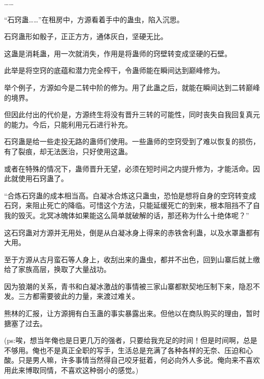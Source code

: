 \begin{this_body}
……

“石窍蛊……”在租房中，方源看着手中的蛊虫，陷入沉思。

石窍蛊形如骰子，正正方方，通体灰白，坚硬无比。

这蛊是消耗蛊，用一次就消失，作用是将蛊师的窍壁转变成坚硬的石壁。

此举是将空窍的底蕴和潜力完全榨干，令蛊师能在瞬间达到巅峰修为。

举个例子，方源如今是二转中阶的修为。用了此蛊之后，就能在瞬间达到二转巅峰的境界。

但因此付出的代价是，方源终生将没有晋升三转的可能性，同时丧失自我回复真元的能力。今后，只能利用元石进行补充。

石窍蛊是给一些走投无路的蛊师们使用。一些蛊师的空窍受到了难以恢复的损伤，有了裂痕，却无法医治，只好使用这蛊。

或者在特殊的情况下，蛊师晋升无望，必须在短时间之内提升修为，才能活命。因此就使用石窍蛊了。

“合炼石窍蛊的成本相当高。白凝冰合炼这只蛊虫，恐怕是想将自身的空窍转变成石窍，来阻止死亡的降临。可惜这个方法，只能延缓死亡的到来，根本阻挡不了自我的毁灭。北冥冰魄体如果能这么简单就破解的话，那还称为什么十绝体呢？”

这石窍蛊对方源并无用处，倒是从白凝冰身上得来的赤铁舍利蛊，以及水罩蛊都有大用。

至于方源从古月蛮石等人身上，收刮出来的蛊虫，都并不出色，回到山寨后就上缴给了家族高层，换取了大量战功。

因为狼潮的关系，青书和白凝冰激战的事情被三家山寨都默契地压制下来，隐忍不发。三方都需要彼此的力量，来渡过难关。

熊林的汇报，让方源拥有白玉蛊的事实暴露出来。但他以在商队购买的理由，暂时搪塞了过去。

(ps:唉，想当年俺也是日更几万的强者，只要给我充足的时间！但是时间啊，总是不够用。俺也不是真正全职的写手，生活总是充满了各种各样的无奈、压迫和心酸。只是男人嘛，许多事情当然得自己咬牙挺着，何必向外人多说。俺向来不喜欢用此来博取同情，不喜欢这种弱小的感觉。)

\end{this_body}

